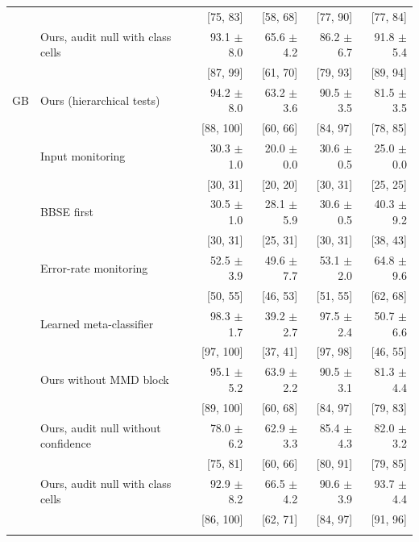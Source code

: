 \documentclass[pdflatex,sn-basic]{sn-jnl}
\begin{document}
\begin{table}[!htbp]
\begin{tabular}{@{}llrrrr@{}}
 &  & [75, 83] & [58, 68] & [77, 90] & [77, 84] \\
 & Ours, audit null with class cells & 93.1 $\pm$ 8.0 & 65.6 $\pm$ 4.2 & 86.2 $\pm$ 6.7 & 91.8 $\pm$ 5.4 \\
 &  & [87, 99] & [61, 70] & [79, 93] & [89, 94] \\
\midrule
GB & Ours (hierarchical tests) & 94.2 $\pm$ 8.0 & 63.2 $\pm$ 3.6 & 90.5 $\pm$ 3.5 & 81.5 $\pm$ 3.5 \\
 &  & [88, 100] & [60, 66] & [84, 97] & [78, 85] \\
 & Input monitoring & 30.3 $\pm$ 1.0 & 20.0 $\pm$ 0.0 & 30.6 $\pm$ 0.5 & 25.0 $\pm$ 0.0 \\
 &  & [30, 31] & [20, 20] & [30, 31] & [25, 25] \\
 & BBSE first & 30.5 $\pm$ 1.0 & 28.1 $\pm$ 5.9 & 30.6 $\pm$ 0.5 & 40.3 $\pm$ 9.2 \\
 &  & [30, 31] & [25, 31] & [30, 31] & [38, 43] \\
 & Error-rate monitoring & 52.5 $\pm$ 3.9 & 49.6 $\pm$ 7.7 & 53.1 $\pm$ 2.0 & 64.8 $\pm$ 9.6 \\
 &  & [50, 55] & [46, 53] & [51, 55] & [62, 68] \\
 & Learned meta-classifier & 98.3 $\pm$ 1.7 & 39.2 $\pm$ 2.7 & 97.5 $\pm$ 2.4 & 50.7 $\pm$ 6.6 \\
 &  & [97, 100] & [37, 41] & [97, 98] & [46, 55] \\
 & Ours without MMD block & 95.1 $\pm$ 5.2 & 63.9 $\pm$ 2.2 & 90.5 $\pm$ 3.1 & 81.3 $\pm$ 4.4 \\
 &  & [89, 100] & [60, 68] & [84, 97] & [79, 83] \\
 & Ours, audit null without confidence & 78.0 $\pm$ 6.2 & 62.9 $\pm$ 3.3 & 85.4 $\pm$ 4.3 & 82.0 $\pm$ 3.2 \\
 &  & [75, 81] & [60, 66] & [80, 91] & [79, 85] \\
 & Ours, audit null with class cells & 92.9 $\pm$ 8.2 & 66.5 $\pm$ 4.2 & 90.6 $\pm$ 3.9 & 93.7 $\pm$ 4.4 \\
 &  & [86, 100] & [62, 71] & [84, 97] & [91, 96] \\
\botrule
\end{tabular}
\end{table}
\end{document}
